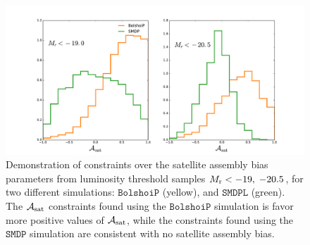 \begin{figure}[p]~\\
\begin{center}
\includegraphics[width=\textwidth]{hist_comparison.pdf}
\caption{Demonstration of constraints over the satellite assembly bias parameters from luminosity threshold samples $M_{\rm r}<-19 ,\; -20.5$, for two different simulations: $\mathtt{BolshoiP}$ (yellow), and $\mathtt{SMDPL}$ (green). The $\mathcal{A}_{\rm sat}$ constraints found using the $\mathtt{BolshoiP}$ simulation is favor more positive values of $\mathcal{A}_{\rm sat}$, while the constraints found using the $\mathtt{SMDP}$ simulation are consistent with no satellite assembly bias.}
\label{fig:asat_comparison}
\end{center}
\end{figure}

\clearpage

